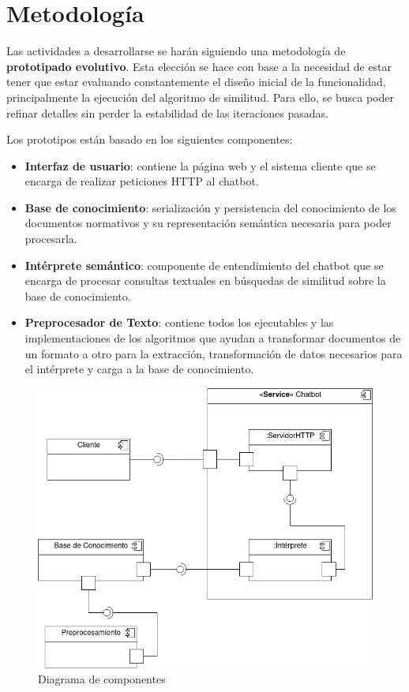 \section{Metodología}

Las actividades a desarrollarse se harán siguiendo una metodología de \textbf{prototipado evolutivo}. Esta elección se hace con base a la necesidad de estar tener que estar evaluando constantemente el diseño inicial de la funcionalidad, principalmente la ejecución del algoritmo de similitud. Para ello, se busca poder refinar detalles sin perder la estabilidad de las iteraciones pasadas.

Los prototipos están basado en los siguientes componentes:

\begin{itemize}
    \item \textbf{Interfaz de usuario}: contiene la página web y el sistema cliente que se encarga de realizar peticiones HTTP al chatbot.
    \item \textbf{Base de conocimiento}: serialización y persistencia del conocimiento de los documentos normativos y su representación semántica necesaria para poder procesarla.
    \item \textbf{Intérprete semántico}: componente de entendimiento del chatbot que se encarga de procesar consultas textuales en búsquedas de similitud sobre la base de conocimiento.
    \item \textbf{Preprocesador de Texto}: contiene todos los ejecutables y las implementaciones de los algoritmos que ayudan a transformar documentos de un formato a otro para la extracción, transformación de datos necesarios para el intérprete y carga a la base de conocimiento.
\end{itemize}

\begin{figure}
    \centering
    \includegraphics[scale=0.5]{images/4/componentes}
    \caption{Diagrama de componentes}
    \label{fig:diagrama-componentes}
\end{figure}

